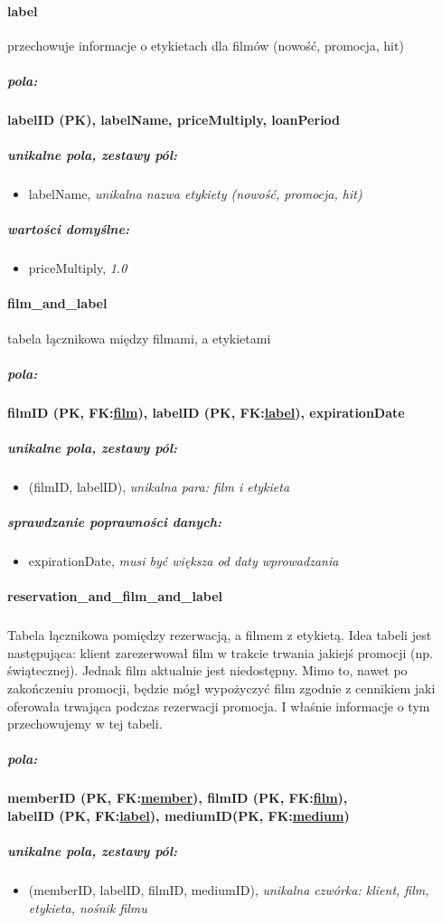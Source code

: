 \documentclass[12pt,a4paper,titlepage]{article}
\begin{document}
\paragraph{label} przechowuje informacje o etykietach dla filmów (nowość, promocja, hit)
\subparagraph{pola:}
\textbf{labelID (PK), labelName, priceMultiply, loanPeriod}
\subparagraph{unikalne pola, zestawy pól:}
\begin{itemize}
	\item labelName, \textit{unikalna nazwa etykiety (nowość, promocja, hit)}
\end{itemize}
\subparagraph{wartości domyślne:}
\begin{itemize}
	\item priceMultiply, \textit{1.0}
\end{itemize}

\paragraph{film\_and\_label} tabela łącznikowa między filmami, a etykietami
\subparagraph{pola:}
\textbf{filmID (PK, FK:\underline{film}), labelID (PK, FK:\underline{label}), expirationDate}
\subparagraph{unikalne pola, zestawy pól:}
\begin{itemize}
	\item (filmID, labelID), \textit{unikalna para: film i etykieta}
\end{itemize}
\subparagraph{sprawdzanie poprawności danych:}
\begin{itemize}
	\item expirationDate, \textit{musi być większa od daty wprowadzania}
\end{itemize}

\newpage

\paragraph{reservation\_and\_film\_and\_label}
\subparagraph{}
Tabela łącznikowa pomiędzy rezerwacją, a filmem z etykietą. Idea tabeli jest następująca: klient zarezerwował film w trakcie trwania jakiejś promocji (np. świątecznej).
Jednak film aktualnie jest niedostępny. Mimo to, nawet po zakończeniu promocji, będzie mógł wypożyczyć film zgodnie z cennikiem jaki oferowała trwająca podczas rezerwacji promocja.
I właśnie informacje o tym przechowujemy w tej tabeli.
\subparagraph{pola:}
\textbf{memberID (PK, FK:\underline{member}), filmID (PK, FK:\underline{film}),} \\\textbf{labelID (PK, FK:\underline{label}), mediumID(PK, FK:\underline{medium})}
\subparagraph{unikalne pola, zestawy pól:}
\begin{itemize}
	\item (memberID, labelID, filmID, mediumID), \textit{unikalna czwórka: klient, film, etykieta, nośnik filmu}
\end{itemize}
\end{document}
